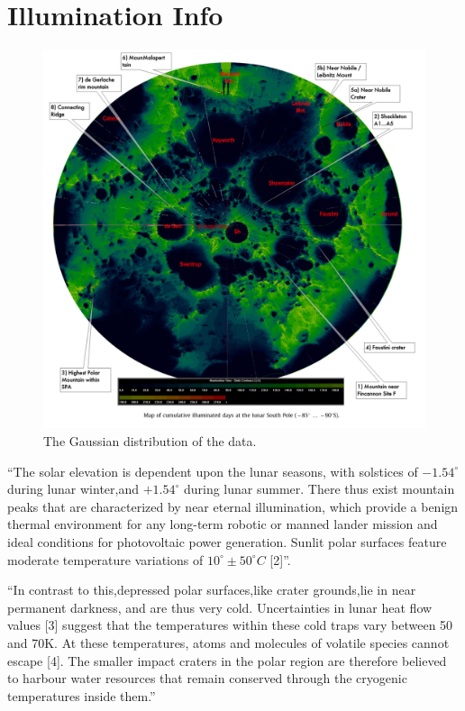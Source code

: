 \documentclass[prl,twocolumn]{revtex4-1}  %
\begin{document}
\section{Illumination Info}


\begin{figure}[!h]
\centering
\includegraphics[width = \linewidth]{South_Pole_Light.jpg}
\caption{ The Gaussian distribution of the data. }
\end{figure}

``The solar elevation is dependent upon the lunar seasons, with solstices of $-1.54^{\circ}$ during lunar winter,and $+1.54^{\circ}$ during lunar summer. There thus exist mountain peaks that are characterized by near eternal illumination, which provide a benign thermal environment for any long-term robotic or manned lander mission and ideal conditions for photovoltaic power generation. Sunlit polar surfaces feature moderate temperature variations of $10^{\circ} \pm 50^{\circ}C$ [2]''\citep{Koebel}.

``In contrast to this,depressed polar surfaces,like crater grounds,lie in near permanent darkness, and are thus very cold. Uncertainties in lunar heat flow values [3] suggest that the temperatures within these cold traps vary between 50 and 70K. At these temperatures, atoms and molecules of volatile species cannot escape [4]. The smaller impact
craters in the polar region are therefore believed to harbour
water resources that remain conserved through the cryogenic temperatures inside them.''\citep{Koebel}
\end{document}
